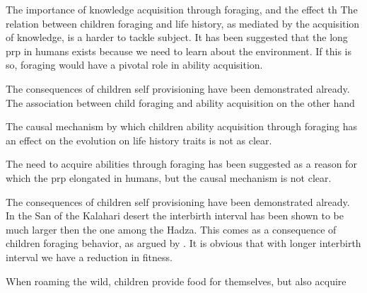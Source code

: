 The importance of knowledge acquisition through foraging, and the effect th
The relation between children foraging and life history, as mediated by the acquisition of knowledge, is a harder to tackle subject. 
It has been suggested that the long prp in humans exists because we need to learn about the environment. If this is so, foraging would have a pivotal role in ability acquisition. 



The consequences of children self provisioning have been demonstrated already. The association between child foraging and ability acquisition on the other hand 

The causal mechanism by which children ability acquisition through foraging has an effect on the evolution on life history traits is not as clear. 


The need to acquire abilities through foraging has been suggested as a reason for which the prp elongated in humans, but the causal mechanism is not clear. 


The consequences of children self provisioning have been demonstrated already. In the San of the Kalahari desert the interbirth interval has been shown to be much larger then the one among the Hadza. This comes as a consequence of children foraging behavior, as argued by \cite{blurton_jones_modelling_1989}. It is obvious that with longer interbirth interval we have a reduction in fitness. 


When roaming the wild, children provide food for themselves, but also acquire 


